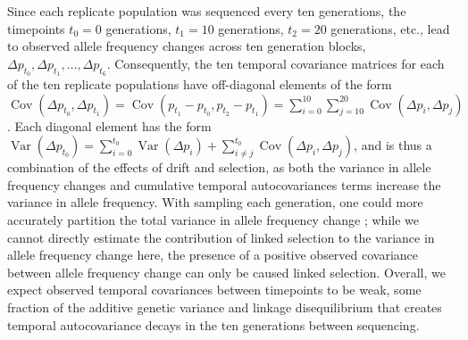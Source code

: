 \documentclass[11pt]{article}
\DeclareMathOperator{\var}{Var}
\DeclareMathOperator{\cov}{Cov}
\begin{document}
Since each replicate population was sequenced every ten generations,
the timepoints $t_0 = 0$ generations, $t_1 = 10$ generations, $t_2 = 20$
generations, etc., lead to observed allele frequency changes across ten
generation blocks, $\Delta p_{t_0}, \Delta p_{t_1}, \ldots, \Delta p_{t_6}$.
Consequently, the ten temporal covariance matrices for each of the ten
replicate populations have off-diagonal elements of the form $\cov(\Delta
p_{t_0}, \Delta p_{t_1}) = \cov(p_{t_1} - p_{t_0}, p_{t_2} - p_{t_1}) =
\sum_{i=0}^{10} \sum_{j=10}^{20} \cov(\Delta p_i, \Delta p_j)$. Each diagonal
element has the form $\var(\Delta p_{t_0}) = \sum_{i=0}^{t_0} \var(\Delta
p_{i}) + \sum_{i \ne j}^{t_0} \cov(\Delta p_{i}, \Delta p_{j})$, and is thus a
combination of the effects of drift and selection, as both the variance in
allele frequency changes and cumulative temporal autocovariances terms increase
the variance in allele frequency. With sampling each generation, one could more
accurately partition the total variance in allele frequency change
\parencite{Buffalo2019-io}; while we cannot directly estimate the contribution
of linked selection to the variance in allele frequency change here, the
presence of a positive observed covariance between allele frequency change can
only be caused linked selection. Overall, we expect observed temporal
covariances between timepoints to be weak, some fraction of the additive
genetic variance and linkage disequilibrium that creates temporal
autocovariance decays in the ten generations between sequencing.
\end{document}
